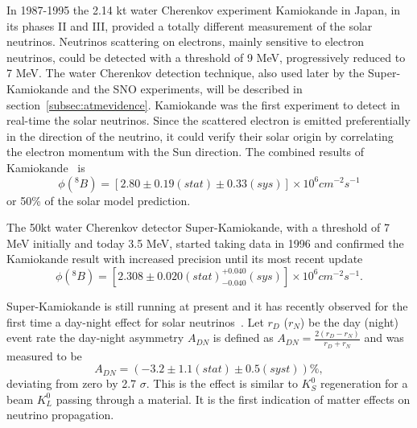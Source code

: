 In 1987-1995 the 2.14 kt water Cherenkov experiment Kamiokande in Japan, in its phases II and III, provided a totally different measurement of the solar neutrinos. Neutrinos scattering on electrons, mainly sensitive to electron neutrinos, could be detected with a threshold of 9 MeV, progressively reduced to 7 MeV.  
The water Cherenkov detection technique, also used later by the Super-Kamiokande and the SNO experiments, will be described in section~\ref{subsec:atmevidence}.   
Kamiokande was the first experiment to detect in real-time the solar neutrinos. Since the scattered electron is emitted preferentially in the direction of the neutrino, it could verify their solar origin by correlating the electron momentum with the Sun direction. The combined results of Kamiokande~\cite{fukuda} is
\begin{equation}
\phi( ^8 B) = [2.80 \pm 0.19 (stat) \pm 0.33 (sys)] \times 10^6 cm^{-2} s^{-1}
\end{equation}
or 50\% of the solar model prediction.

The 50kt water Cherenkov detector Super-Kamiokande, with a threshold of 7 MeV initially and today 3.5 MeV, started taking data in 1996 and confirmed the Kamiokande result with increased precision until its most recent update~\cite{abesk4}
\begin{equation}
\phi( ^8 B) = [2.308 \pm 0.020 (stat) ^{+0.040}_{-0.040} (sys)] \times 10^6 cm^{-2} s^{-1}.
\end{equation} 

Super-Kamiokande is still running at present and it has recently observed for the first time a day-night effect for solar neutrinos~\cite{renshaw}. 
Let $r_D$ ($r_N$) be the day (night) event rate
the day-night asymmetry $A_{DN}$ is defined as $A_{DN} = \frac{2 (r_D - r_N) }{r_D + r_N}$ and was measured to be
\begin{equation}
A_{DN} = (−3.2 \pm 1.1 (stat) \pm 0.5 (syst)) \%,
\end{equation} 
deviating from zero by 2.7 $\sigma$.
This is the effect is similar to $K_S^0$ regeneration for a beam $K_L^0$ passing through a material. It is the first indication of matter effects on neutrino propagation. 


